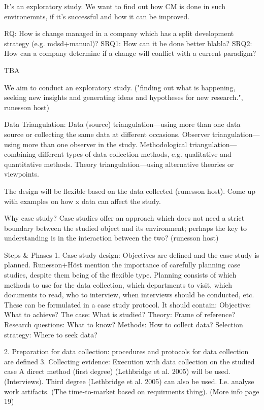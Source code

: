 \documentclass[times, 10pt,twocolumn]{IEEEtran}
\begin{document}
It's an exploratory study. We want to find out how CM is done in such environemnts, if it's successful and how it can be improved. 

RQ: How is change managed in a company which has a split development strategy (e.g. mdsd+manual)?
SRQ1: How can it be done better blabla?
SRQ2: How can a company determine if a change will conflict with a current paradigm?

TBA

We aim to conduct an exploratory study. ("finding out what is happening, seeking new insights and generating ideas
and hypotheses for new research.", runesson host)

Data Triangulation:
Data (source) triangulation—using more than one data source or collecting the same
data at different occasions.
Observer triangulation—using more than one observer in the study.
Methodological triangulation—combining different types of data collection methods,
e.g. qualitative and quantitative methods.
Theory triangulation—using alternative theories or viewpoints.

The design will be flexible based on the data collected (runesson host). 
	Come up with examples on how x data can affect the study. 


Why case study? 
Case studies offer an approach which does not need a strict boundary between the studied object and its environment; perhaps the key to understanding is in the interaction between the two? (runesson host)

Steps \& Phases
1. Case study design: Objectives are defined and the case study is planned. 
Runesson+Höst mention the importance of carefully planning case studies, despite them being of the flexible type. 
Planning consists of which methods to use for the data collection, which departments to visit, which documents to read, who to interview, when interviews should be conducted, etc. These can be formulated in a case study protocol. 
It should contain: 
Objective: What to achieve?
The case: What is studied?
Theory: Frame of reference?
Research questions: What to know?
Methods: How to collect data?
Selection strategy: Where to seek data?

2. Preparation for data collection: procedures and protocols for data collection are defined
3. Collecting evidence: Execution with data collection on the studied case
A direct method (first degree) (Lethbridge et al. 2005) will be used. (Interviews).
Third degree (Lethbridge et al. 2005) can also be used. I.e. analyse work artifacts. (The time-to-market based on requirments thing). (More info page 19)
\end{document}
